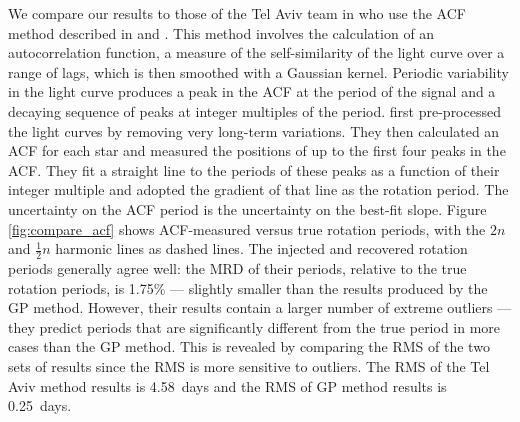 \documentclass[a4paper,fleqn,usenatbib,useAMS]{mnras}
\newcommand{\response}[1]{{#1}}
\newcommand{\ie}{{\it i.e.}}
\newcommand{\gpRMS}{0.25}
\newcommand{\telavivRMS}{4.58}
\newcommand{\percenttelavivMAD}{1.75}
\begin{document}
We compare our results to those of the Tel Aviv team in \citet{Aigrain2015}
who use the ACF method described in \citet{Mcquillan2014} and
\citet{Aigrain2015}.
\response{This method involves the calculation of an autocorrelation function, a
measure of the self-similarity of the light curve over a range of lags, which
is then smoothed with a Gaussian kernel.
Periodic variability in the light curve produces a peak in the ACF at the
period of the signal and a decaying sequence of peaks at integer multiples of
the period.
\citet{Mcquillan2014} first pre-processed the light curves by removing very
long-term variations.
They then calculated an ACF for each star and measured the positions of up to
the first four peaks in the ACF.
They fit a straight line to the periods of these peaks as a function of their
integer multiple and adopted the gradient of that line as the rotation
period.
The uncertainty on the ACF period is the uncertainty on the best-fit slope.
}
Figure \ref{fig:compare_acf} shows ACF-measured versus true rotation
periods, with the $2n$ and $\frac{1}{2}n$ harmonic lines as dashed lines.
The injected and recovered rotation periods generally agree well: the MRD of
their periods, relative to the true rotation periods, is \percenttelavivMAD\%
--- slightly smaller than the results produced by the GP method.
However, their results contain a larger number of extreme outliers --- they
predict periods that are significantly different from the true period in more
cases than the GP method.
This is revealed by comparing the RMS of the two sets of results since the RMS
is more sensitive to outliers.
The RMS of the Tel Aviv method results is \telavivRMS\ days and the RMS of GP
method results is \gpRMS\ days.

\end{document}
